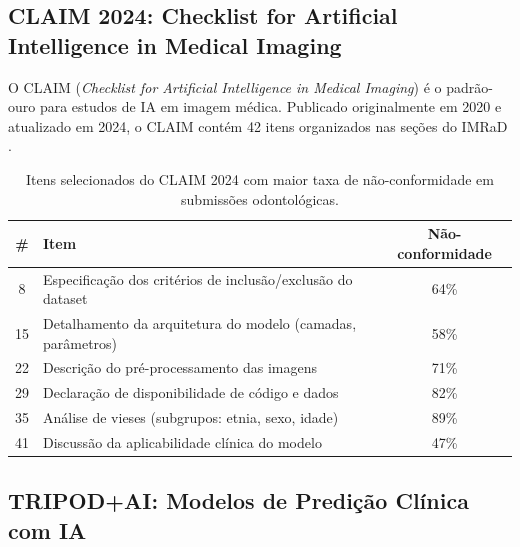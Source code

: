 
\subsection{CLAIM 2024: Checklist for Artificial Intelligence in Medical Imaging}

O CLAIM (\textit{Checklist for Artificial Intelligence in Medical Imaging}) é
o padrão-ouro para estudos de IA em imagem médica. Publicado originalmente em
2020 e atualizado em 2024, o CLAIM contém 42 itens organizados nas seções do
IMRaD \cite{mongan2020claim}.


\begin{table}[H]
  \centering
  \caption{Itens selecionados do CLAIM 2024 com maior taxa de não-conformidade
  em submissões odontológicas.}
  \label{tab:claim-2024}
  \begin{tabularx}{\textwidth}{cXc}
    \toprule
    \textbf{\#} & \textbf{Item} & \textbf{Não-conformidade} \\
    \midrule
    8  & Especificação dos critérios de inclusão/exclusão do dataset & 64\% \\
    15 & Detalhamento da arquitetura do modelo (camadas, parâmetros) & 58\% \\
    22 & Descrição do pré-processamento das imagens & 71\% \\
    29 & Declaração de disponibilidade de código e dados & 82\% \\
    35 & Análise de vieses (subgrupos: etnia, sexo, idade) & 89\% \\
    41 & Discussão da aplicabilidade clínica do modelo & 47\% \\
    \bottomrule
  \end{tabularx}
\end{table}


\subsection{TRIPOD+AI: Modelos de Predição Clínica com IA}

